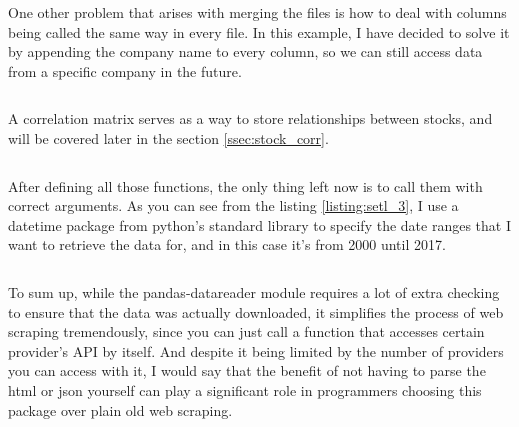 \documentclass[12pt, a4paper]{article}
\begin{document}
\bgroup
  \inputminted[linenos, breaklines=true, fontsize=\scriptsize, firstnumber=last]{python}{src/stocks/etl/2a_listcsv.py}
  \label{listing:setl_2a_listcsv}
\egroup

\bgroup
  \inputminted[linenos, breaklines=true, fontsize=\scriptsize, firstnumber=last]{python}{src/stocks/etl/2c_reindex.py}
  \label{listing:setl_2c_reindex}
\egroup

One other problem that arises with merging the files is how to deal with columns being called the same way in every file. In this example, I have decided to solve it by appending the company name to every column, so we can still access data from a specific company in the future.

\bgroup
  \inputminted[linenos, breaklines=true, fontsize=\scriptsize, firstnumber=last]{python}{src/stocks/etl/2d_merge.py}
  \label{listing:setl_2d_merge}
\egroup

A correlation matrix serves as a way to store relationships between stocks, and will be covered later in the section \ref{ssec:stock_corr}.

\bgroup
  \inputminted[linenos, breaklines=true, fontsize=\scriptsize, firstnumber=last]{python}{src/stocks/etl/2f_corr.py}
  \label{listing:setl_2f_corr}
\egroup



After defining all those functions, the only thing left now is to call them with correct arguments. As you can see from the listing \ref{listing:setl_3}, I use a datetime package from python’s standard library to specify the date ranges that I want to retrieve the data for, and in this case it’s from 2000 until 2017.

\bgroup
  \inputminted[linenos, breaklines=true, fontsize=\scriptsize, firstnumber=last]{python}{src/stocks/etl/3_executing.py}
  \label{listing:setl_3}
\egroup

To sum up, while the pandas-datareader module requires a lot of extra checking to ensure that the data was actually downloaded, it simplifies the process of web scraping tremendously, since you can just call a function that accesses certain provider’s API by itself. And despite it being limited by the number of providers you can access with it, I would say that the benefit of not having to parse the html or json yourself can play a significant role in programmers choosing this package over plain old web scraping.
\end{document}
